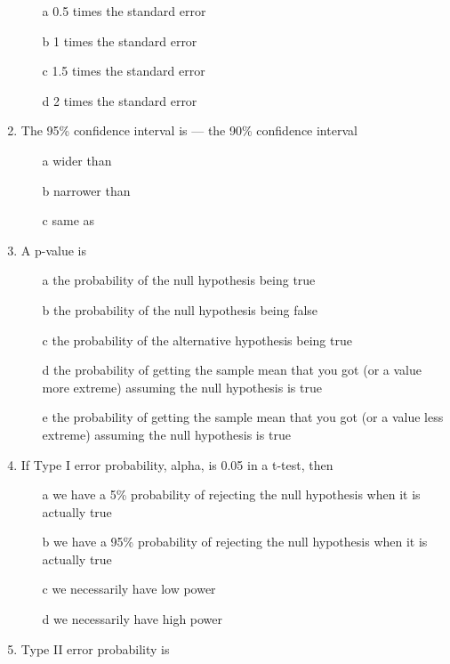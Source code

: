 \documentclass[12pt]{book}\usepackage[]{graphicx}\usepackage[]{color}
\begin{document}
\begin{enumerate}
\begin{enumerate}
\item[a]
 0.5 times the standard error
\item[b]
 1 times the standard error
\item[c]
1.5 times the standard error
\item[d]
2 times the standard error
\end{enumerate}

\item
The 95\% confidence interval is --- the 90\% confidence interval

\begin{enumerate}
\item[a]
wider than
\item[b]
narrower than
\item[c]
same as
\end{enumerate}

\item
A p-value is

\begin{enumerate}
\item[a]
the probability of the null hypothesis being true
\item[b]
the probability of the null hypothesis being false
\item[c]
the probability of the alternative hypothesis being true
\item[d]
the probability of getting the sample mean that you got (or a value more extreme) assuming the null hypothesis is true
\item[e]
the probability of getting the sample mean that you got (or a value less extreme) assuming the null hypothesis is true
\end{enumerate}

\item
If Type I error probability, alpha, is 0.05 in a t-test, then

\begin{enumerate}
\item[a]
we have a 5\% probability of rejecting the null hypothesis when it is actually true
\item[b]
we have a 95\% probability of rejecting the null hypothesis when it is actually true
\item[c]
we necessarily have low power
\item[d]
we necessarily have high power
\end{enumerate}

\item
Type II error probability is


\end{enumerate}
\end{document}
